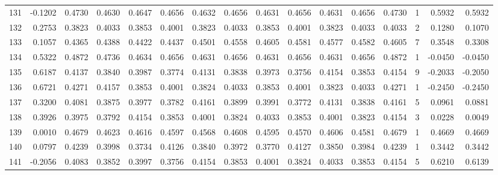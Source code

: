 \begin{tabular}{lrrrrrrrrrrrrrrr}
131 &     -0.1202 &  0.4730 &  0.4630 &  0.4647 &  0.4656 &  0.4632 &  0.4656 &  0.4631 &  0.4656 &  0.4631 &   0.4656 &     0.4730 &      1 &                    0.5932 &                     0.5932 \\
132 &      0.2753 &  0.3823 &  0.4033 &  0.3853 &  0.4001 &  0.3823 &  0.4033 &  0.3853 &  0.4001 &  0.3823 &   0.4033 &     0.4033 &      2 &                    0.1280 &                     0.1070 \\
133 &      0.1057 &  0.4365 &  0.4388 &  0.4422 &  0.4437 &  0.4501 &  0.4558 &  0.4605 &  0.4581 &  0.4577 &   0.4582 &     0.4605 &      7 &                    0.3548 &                     0.3308 \\
134 &      0.5322 &  0.4872 &  0.4736 &  0.4634 &  0.4656 &  0.4631 &  0.4656 &  0.4631 &  0.4656 &  0.4631 &   0.4656 &     0.4872 &      1 &                   -0.0450 &                    -0.0450 \\
135 &      0.6187 &  0.4137 &  0.3840 &  0.3987 &  0.3774 &  0.4131 &  0.3838 &  0.3973 &  0.3756 &  0.4154 &   0.3853 &     0.4154 &      9 &                   -0.2033 &                    -0.2050 \\
136 &      0.6721 &  0.4271 &  0.4157 &  0.3853 &  0.4001 &  0.3824 &  0.4033 &  0.3853 &  0.4001 &  0.3823 &   0.4033 &     0.4271 &      1 &                   -0.2450 &                    -0.2450 \\
137 &      0.3200 &  0.4081 &  0.3875 &  0.3977 &  0.3782 &  0.4161 &  0.3899 &  0.3991 &  0.3772 &  0.4131 &   0.3838 &     0.4161 &      5 &                    0.0961 &                     0.0881 \\
138 &      0.3926 &  0.3975 &  0.3792 &  0.4154 &  0.3853 &  0.4001 &  0.3824 &  0.4033 &  0.3853 &  0.4001 &   0.3823 &     0.4154 &      3 &                    0.0228 &                     0.0049 \\
139 &      0.0010 &  0.4679 &  0.4623 &  0.4616 &  0.4597 &  0.4568 &  0.4608 &  0.4595 &  0.4570 &  0.4606 &   0.4581 &     0.4679 &      1 &                    0.4669 &                     0.4669 \\
140 &      0.0797 &  0.4239 &  0.3998 &  0.3734 &  0.4126 &  0.3840 &  0.3972 &  0.3770 &  0.4127 &  0.3850 &   0.3984 &     0.4239 &      1 &                    0.3442 &                     0.3442 \\
141 &     -0.2056 &  0.4083 &  0.3852 &  0.3997 &  0.3756 &  0.4154 &  0.3853 &  0.4001 &  0.3824 &  0.4033 &   0.3853 &     0.4154 &      5 &                    0.6210 &                     0.6139 \\

\end{tabular}
